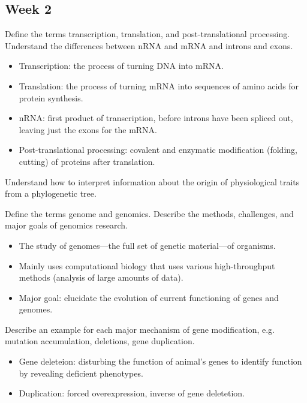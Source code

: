\documentclass[12pt,a4paper]{article}
\begin{document}
\subsection{Week 2}
\begin{itemize}
    {\color{G-Moon}\item Define the terms transcription, translation, and post-translational processing. Understand the differences between nRNA and mRNA and introns and exons.}
        \begin{itemize}
            \item Transcription: the process of turning DNA into mRNA.
            \item Translation: the process of turning mRNA into sequences of amino acids for protein synthesis.
            \item nRNA: first product of transcription, before introns have been spliced out, leaving just the exons for the mRNA.
            \item Post-translational processing: covalent and enzymatic modification (folding, cutting) of proteins after translation.
        \end{itemize}
    {\color{G-Moon}\item Understand how to interpret information about the origin of physiological traits from a phylogenetic tree.}
    {\color{G-Moon}\item Define the terms genome and genomics. Describe the methods, challenges, and major goals of genomics research.}
        \begin{itemize}
            \item The study of genomes---the full set of genetic material---of organisms.
            \item Mainly uses computational biology that uses various high-throughput methods (analysis of large amounts of data).
            \item Major goal: elucidate the evolution of current functioning of genes and genomes.
        \end{itemize}
    {\color{G-Moon}\item Describe an example for each major mechanism of gene modification, e.g. mutation accumulation, deletions, gene duplication.}
        \begin{itemize}
            \item Gene deleteion: disturbing the function of animal's genes to identify function by revealing deficient phenotypes.
            \item Duplication: forced overexpression, inverse of gene deletetion.

\end{itemize}
\end{itemize}
\end{document}
